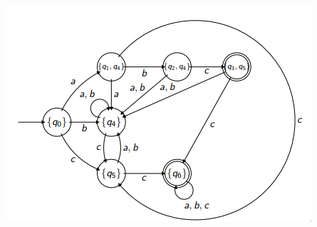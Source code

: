 \documentclass[12pt]{article}
\begin{document}
\begin{itemize}
        \includegraphics[scale=0.8]{dfa_ex2.png}
\end{itemize}

\newpage
\end{document}
